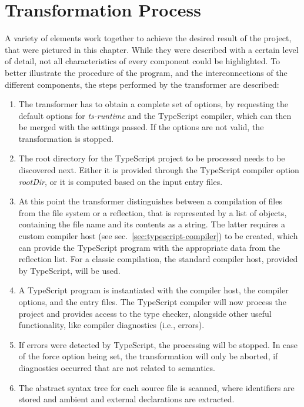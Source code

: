 \section{Transformation Process} %
\label{sec:transformation-process}
A variety of elements work together to achieve the desired result of the project, that were pictured in this chapter. While they were described with a certain level of detail, not all characteristics of every component could be highlighted. To better illustrate the procedure of the program, and the interconnections of the different components, the steps performed by the transformer are described:
\begin{enumerate}
  \item The transformer has to obtain a complete set of options, by requesting the default options for \emph{ts-runtime} and the TypeScript compiler, which can then be merged with the settings passed. If the options are not valid, the transformation is stopped.
  \item The root directory for the TypeScript project to be processed needs to be discovered next. Either it is provided through the TypeScript compiler option \emph{rootDir}, or it is computed based on the input entry files.
  \item At this point the transformer distinguishes between a compilation of files from the file system or a reflection, that is represented by a list of objects, containing the file name and its contents as a string. The latter requires a custom compiler host (see sec.~\ref{sec:typescript-compiler}) to be created, which can provide the TypeScript program with the appropriate data from the reflection list. For a classic compilation, the standard compiler host, provided by TypeScript, will be used.
  \item A TypeScript program is instantiated with the compiler host, the compiler options, and the entry files. The TypeScript compiler will now process the project and provides access to the type checker, alongside other useful functionality, like compiler diagnostics (i.e., errors).
  \item If errors were detected by TypeScript, the processing will be stopped. In case of the force option being set, the transformation will only be aborted, if diagnostics occurred that are not related to semantics.
  \item The abstract syntax tree for each source file is scanned, where identifiers are stored and ambient and external declarations are extracted.

\end{enumerate}

